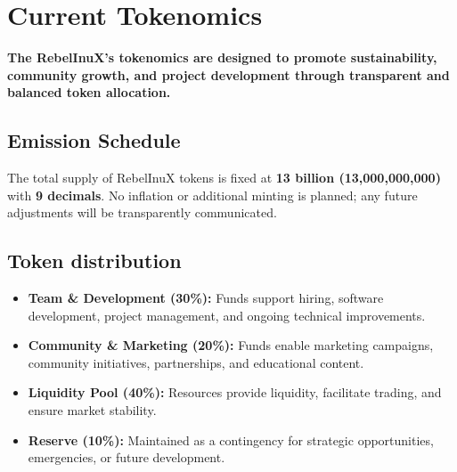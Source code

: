 \documentclass{article}
\begin{document}
\newpage
\tableofcontents
\newpage

\vspace{0em}
\section[
  \texorpdfstring{\color{primaryColor}Current Tokenomics}{Current Tokenomics}
]{\color{primaryColor}\textbf{Current Tokenomics}}
\begin{tcolorbox}[colback=headerColor!10!white, colframe=headerColor, boxrule=2pt, width=\textwidth, arc=6mm, left=8mm, right=8mm, top=6mm, bottom=6mm]
\textbf{The RebelInuX's tokenomics are designed to promote sustainability, community growth, and project development through transparent and balanced token allocation.}

\subsection[
  \texorpdfstring{\color{primaryColor}Emission Schedule}{Emission Schedule}
]{\color{primaryColor}Emission Schedule}

The total supply of RebelInuX tokens is fixed at \textbf{13 billion (13,000,000,000)} with \textbf{9 decimals}. No inflation or additional minting is planned; any future adjustments will be transparently communicated.

\subsection[
  \texorpdfstring{\color{primaryColor}Token distribution}{Token distribution}
]{\color{primaryColor}Token distribution}

\begin{itemize}
  \item \textbf{Team \& Development (30\%):} Funds support hiring, software development, project management, and ongoing technical improvements.
  \item \textbf{Community \& Marketing (20\%):} Funds enable marketing campaigns, community initiatives, partnerships, and educational content.
  \item \textbf{Liquidity Pool (40\%):} Resources provide liquidity, facilitate trading, and ensure market stability.
  \item \textbf{Reserve (10\%):} Maintained as a contingency for strategic opportunities, emergencies, or future development.
\end{itemize}


\end{tcolorbox}
\end{document}
